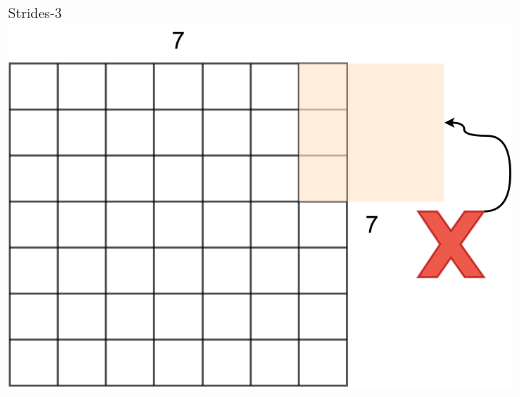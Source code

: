 \documentclass[default, aspectratio=169]{beamer}
\begin{document}
\begin{frame}{Strides-3}
		\hspace{0.2cm}
		\includegraphics[keepaspectratio, scale=0.15]{pic/Stride11.png}
	\end{frame}
	
\end{document}
